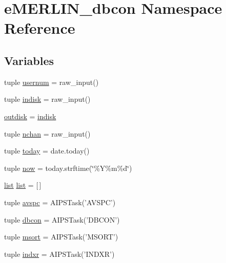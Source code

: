 \hypertarget{namespacee_m_e_r_l_i_n__dbcon}{\section{e\-M\-E\-R\-L\-I\-N\-\_\-dbcon \-Namespace \-Reference}
\label{namespacee_m_e_r_l_i_n__dbcon}
}
\subsection*{\-Variables}
\begin{DoxyCompactItemize}
\item 
tuple \hyperlink{namespacee_m_e_r_l_i_n__dbcon_a38e946965ca0b344061675a1a395cb08}{usernum} = raw\-\_\-input()
\item 
tuple \hyperlink{namespacee_m_e_r_l_i_n__dbcon_a3b3d57aefde6e9d540ecb3801fac5664}{indisk} = raw\-\_\-input()
\item 
\hyperlink{namespacee_m_e_r_l_i_n__dbcon_a10a2e5d653a36bede24e60c74e4ed0a3}{outdisk} = \hyperlink{namespacee_m_e_r_l_i_n__dbcon_a3b3d57aefde6e9d540ecb3801fac5664}{indisk}
\item 
tuple \hyperlink{namespacee_m_e_r_l_i_n__dbcon_ac41ff8a94095c2e305fed016874bb042}{nchan} = raw\-\_\-input()
\item 
tuple \hyperlink{namespacee_m_e_r_l_i_n__dbcon_a504efe89c5a32a95950b6c5e078315e5}{today} = date.\-today()
\item 
tuple \hyperlink{namespacee_m_e_r_l_i_n__dbcon_aab95cae7a70890c472b8b8feb7d11ceb}{now} = today.\-strftime(\char`\"{}\%\-Y\%m\%d\char`\"{})
\item 
\hyperlink{namespacee_m_e_r_l_i_n__dbcon_ab058e469d8921bc98b806969ffd1e2a2}{list} \hyperlink{namespacee_m_e_r_l_i_n__dbcon_ab058e469d8921bc98b806969ffd1e2a2}{list} = \mbox{[}$\,$\mbox{]}
\item 
tuple \hyperlink{namespacee_m_e_r_l_i_n__dbcon_a429c00f0b03f4f27e9854fbed5db3764}{avspc} = \-A\-I\-P\-S\-Task('\-A\-V\-S\-P\-C')
\item 
tuple \hyperlink{namespacee_m_e_r_l_i_n__dbcon_ab17a9c5aaeb6b610ba038d24839ab3b2}{dbcon} = \-A\-I\-P\-S\-Task('\-D\-B\-C\-O\-N')
\item 
tuple \hyperlink{namespacee_m_e_r_l_i_n__dbcon_a0b851c2b085a1289afca9f960d54d4c6}{msort} = \-A\-I\-P\-S\-Task('\-M\-S\-O\-R\-T')
\item 
tuple \hyperlink{namespacee_m_e_r_l_i_n__dbcon_a306e8762b0925929428f0264f23a6674}{indxr} = \-A\-I\-P\-S\-Task('\-I\-N\-D\-X\-R')
\item 

\end{DoxyCompactItemize}
